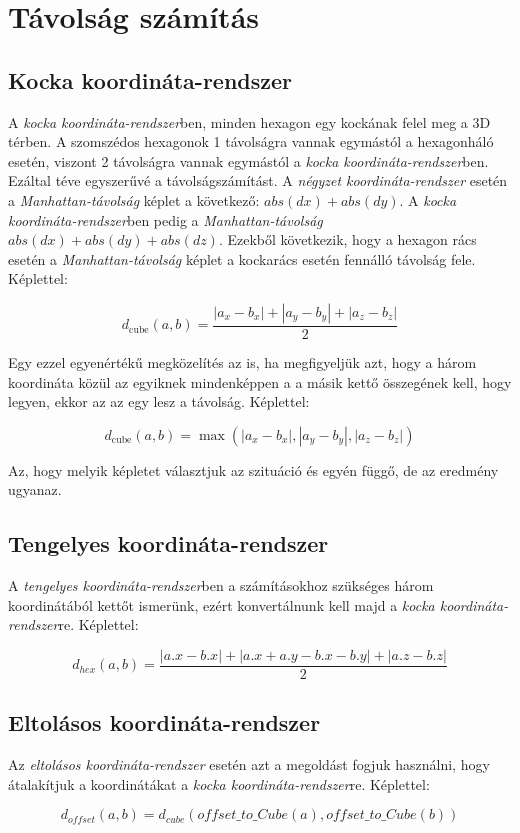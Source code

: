 \section{Távolság számítás}

\subsection{Kocka koordináta-rendszer}

A \textit{kocka koordináta-rendszer}ben, minden hexagon egy kockának felel meg a 3D térben. A szomszédos hexagonok 1 távolságra vannak egymástól a hexagonháló esetén, viszont 2 távolságra vannak egymástól a \textit{kocka koordináta-rendszer}ben. Ezáltal téve egyszerűvé a távolságszámítást. A \textit{négyzet koordináta-rendszer} esetén a \textit{Manhattan-távolság} képlet a következő: $abs(dx) + abs(dy)$. A \textit{kocka koordináta-rendszer}ben pedig a \textit{Manhattan-távolság} $abs(dx) + abs(dy) + abs(dz)$. Ezekből következik, hogy a hexagon rács esetén a \textit{Manhattan-távolság} képlet a kockarács esetén fennálló távolság fele.
\newline
\newline Képlettel:

$$
d_{\text{cube}}(a, b) =
\dfrac{|a_x - b_x| + |a_y - b_y| + |a_z - b_z|}{2}
$$

\noindent Egy ezzel egyenértékű megközelítés az is, ha megfigyeljük azt, hogy a három koordináta közül az egyiknek mindenképpen a a másik kettő összegének kell, hogy legyen, ekkor az az egy lesz a távolság. 
\newline
\newline Képlettel:

$$
d_{\text{cube}}(a, b) =
\max(
|a_x - b_x|, |a_y - b_y|, |a_z - b_z|
)
$$

\noindent Az, hogy melyik képletet választjuk az szituáció és egyén függő, de az eredmény ugyanaz.

\subsection{Tengelyes koordináta-rendszer}

A \textit{tengelyes koordináta-rendszer}ben a számításokhoz szükséges három koordinátából kettőt ismerünk, ezért konvertálnunk kell majd a \textit{kocka koordináta-rendszer}re.
\newline
\newline Képlettel:

$$
d_{hex}(a, b) = \frac{|a.x - b.x| + |a.x + a.y - b.x - b.y| + |a.z - b.z|}{2}
$$

\subsection{Eltolásos koordináta-rendszer}

Az \textit{eltolásos koordináta-rendszer} esetén azt a megoldást fogjuk használni, hogy átalakítjuk a koordinátákat a \textit{kocka koordináta-rendszer}re.
\newline
\newline Képlettel:

$$
d_{of\!fset} (a, b) = d_{cube}(of\!fset\_to\_Cube(a), of\!fset\_to\_Cube(b)) 
$$

